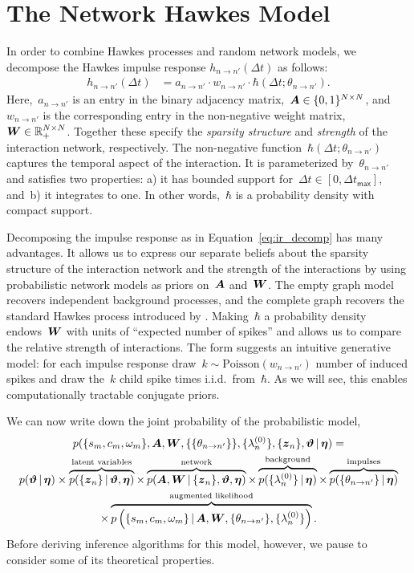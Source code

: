 \section{The Network Hawkes Model}
\label{sec:network_hawkes_model}
In order to combine Hawkes processes and random network models, we
decompose the Hawkes impulse response $h_{n \to n'}(\Delta t)$ as
follows:
\begin{align}
\label{eq:ir_decomp}
h_{n \to n'}(\Delta t) &= a_{n \to n'} \cdot w_{n \to n'} \cdot \hbar(\Delta t; \theta_{n \to n'}).
\end{align}
Here,~$a_{n \to n'}$ is an entry in the binary adjacency
matrix,~${\boldsymbol{A}\in\{0,1\}^{N \times N}}$,
and~$w_{n \to n'}$ is the corresponding entry in the non-negative
weight matrix,~${\boldsymbol{W} \in\mathbb{R}_+^{N\times N}}$. Together these specify
the \emph{sparsity structure} and \emph{strength} of the interaction
network, respectively. The non-negative function~${\hbar(\Delta t;
  \theta_{n \to n'})}$ captures the temporal aspect of the
interaction. It is parameterized by~${\theta_{n \to n'}}$ and
satisfies two properties: a) it has bounded support for~${\Delta t \in
  [0,\Delta t_{\mathsf{max}}]}$, and~b) it integrates to one. In other
words,~$\hbar$ is a probability density with compact support.

Decomposing the impulse response as in Equation~\ref{eq:ir_decomp} has
many advantages. It allows us to express our separate beliefs about
the sparsity structure of the interaction network and the strength of
the interactions by using probabilistic network models as priors
on~$\boldsymbol{A}$ and~$\boldsymbol{W}$.  The empty graph model recovers independent
background processes, and the complete graph recovers the standard
Hawkes process introduced by \citet{Hawkes-1971}.  Making~$\hbar$ a
probability density endows~$\boldsymbol{W}$ with units of ``expected number of
spikes'' and allows us to compare the relative strength of
interactions. The form suggests an intuitive generative model: for
each impulse response draw~${k \sim \text{Poisson}(w_{n \to n'})}$
number of induced spikes and draw the~$k$ child spike times
i.i.d.\ from~$\hbar$.  
As we will see, this enables computationally
tractable conjugate priors.

We can now write down the joint probability of the probabilistic model,
\begin{multline}
\label{eq:hawkes_complete_model}
p(\{s_m, c_m, \omega_m\}, \boldsymbol{A}, \boldsymbol{W}, \{\{\theta_{n \to n'}\}\}, \{\lambda^{(0)}_{n}\}, \{\boldsymbol{z}_n\}, \boldsymbol{\vartheta} \,|\, \boldsymbol{\eta}) 
=  \\
p(\boldsymbol{\vartheta} \,|\, \boldsymbol{\eta})
\times \overbrace{p(\{\boldsymbol{z}_n\} \,|\, \boldsymbol{\vartheta}, \boldsymbol{\eta})}^\text{latent variables}
\times \overbrace{p(\boldsymbol{A}, \boldsymbol{W} \,|\, \{\boldsymbol{z}_{n}\}, \boldsymbol{\vartheta}, \boldsymbol{\eta})}^\text{network} 
\times \overbrace{p(\{\lambda^{(0)}_{n}\} \,|\, \boldsymbol{\eta})}^\text{background}
\times \overbrace{p(\{\theta_{n\to n'}\} \,|\, \boldsymbol{\eta})}^\text{impulses} \\
\times \overbrace{  p \left(\{s_m, c_m, \omega_m\} \,|\, \boldsymbol{A}, \boldsymbol{W}, \{\theta_{n \to n'}\}, \{\lambda^{(0)}_{n}\} \right) }^\text{augmented likelihood}.
\end{multline}
Before deriving inference algorithms for this model, however, we pause 
to consider some of its theoretical properties.


